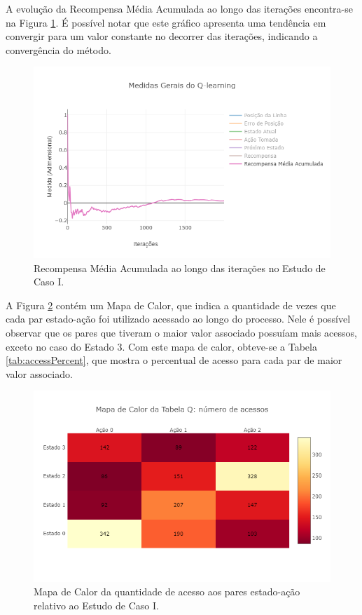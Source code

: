 \documentclass[a4paper]{ifacconf}
\begin{document}
A evolução da Recompensa Média Acumulada ao longo das iterações encontra-se na Figura \ref{fig:basic_chart2}. É possível notar que este gráfico apresenta uma tendência em convergir para um valor constante no decorrer das iterações, indicando a convergência do método. 

\begin{figure}
\centering 
\includegraphics[scale=0.35]{Figuras/basic_chart2.png}
\caption{Recompensa Média Acumulada ao longo das iterações no Estudo de Caso I.} 
\label{fig:basic_chart2}
\end{figure}

A Figura \ref{fig:basic_chart3} contém um Mapa de Calor, que indica a quantidade de vezes que cada par estado-ação foi utilizado acessado ao longo do processo. Nele é possível observar que os pares que tiveram o maior valor associado possuíam mais acessos, exceto no caso do Estado 3. Com este mapa de calor, obteve-se a Tabela \ref{tab:accessPercent}, que mostra o percentual de acesso para cada par de maior valor associado. 

\begin{figure}
\centering 
\includegraphics[scale=0.35]{Figuras/basic_chart3.png}
\caption{Mapa de Calor da quantidade de acesso aos pares estado-ação relativo ao Estudo de Caso I.} 
\label{fig:basic_chart3}
\end{figure}
\end{document}
